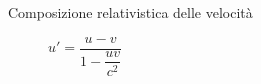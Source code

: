 \documentclass[a4paper,11pt,italian]{article}
\begin{document}
\begin{description}
%   
  
  
  \item[Composizione relativistica delle velocità]
  $ u' = \dfrac{u - v}{1- \dfrac{u v}{c^2}} $
  
%   
%   
%   
  

\end{description}
\end{document}
